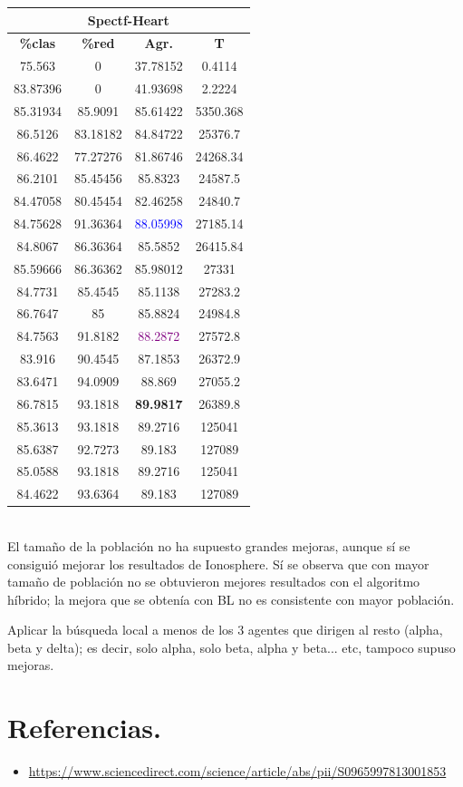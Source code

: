 \documentclass[11pt,a4paper]{article}
\theoremstyle{definition}
\begin{document}
\begin{tabbing}
{		\begin{tabular}{|c|c|c|c|}
			\hline
			\multicolumn{4}{|c|}{\textbf{Spectf-Heart}} \\ \hline
			\textbf{\%clas} & \textbf{\%red} & \textbf{Agr.} & \textbf{T} \\ \hline 
			75.563	  &0	      &37.78152	&0.4114\\ \hline
83.87396	&0	      &41.93698	&2.2224\\ \hline
85.31934	&85.9091	&85.61422	&5350.368\\ \hline
86.5126 & 83.18182 & 84.84722 & 25376.7\\ \hline
86.4622 & 77.27276 & 81.86746 & 24268.34\\ \hline
86.2101 & 85.45456 & 85.8323 & 24587.5\\ \hline
84.47058 & 80.45454 & 82.46258 & 24840.7\\ \hline
84.75628 & 91.36364 & \textcolor{blue}{88.05998} & 27185.14\\ \hline
84.8067 & 86.36364 & 85.5852 & 26415.84\\ \hline
85.59666 & 86.36362 & 85.98012 & 27331\\ \hline
84.7731 & 85.4545 & 85.1138 & 27283.2 \\ \hline
86.7647 & 85 & 85.8824 & 24984.8 \\ \hline
84.7563 & 91.8182 & \textcolor{purple}{88.2872} & 27572.8 \\ \hline
83.916 & 90.4545 & 87.1853 & 26372.9 \\ \hline
83.6471 & 94.0909 & 88.869 & 27055.2 \\ \hline
86.7815 & 93.1818 & \textbf{89.9817} & 26389.8 \\ \hline
85.3613 & 93.1818 & 89.2716 & 125041 \\ \hline
85.6387 & 92.7273 & 89.183 & 127089 \\ \hline
85.0588 & 93.1818 & 89.2716 & 125041 \\ \hline
84.4622 & 93.6364 & 89.183 & 127089 \\ \hline
		\end{tabular}
		}
	\end{tabbing}~\\
	
	El tamaño de la población no ha supuesto grandes mejoras, aunque sí se consiguió mejorar los resultados de Ionosphere. Sí se observa que con mayor tamaño de población no se obtuvieron mejores resultados con el algoritmo híbrido; la mejora que se obtenía con BL no es consistente con mayor población.
	
	Aplicar la búsqueda local a menos de los 3 agentes que dirigen al resto (alpha, beta y delta); es decir, solo alpha, solo beta, alpha y beta... etc, tampoco supuso mejoras.
	\section{Referencias.}
	\begin{itemize}
		\item \url{https://www.sciencedirect.com/science/article/abs/pii/S0965997813001853}
	\end{itemize}
\end{document}
